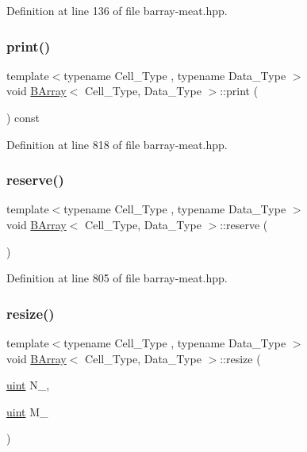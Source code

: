 Definition at line 136 of file barray-\/meat.\+hpp.

\mbox{\label{class_b_array_a9d150c44b23cf1e4af45f540508db1de}} 
\subsubsection{\texorpdfstring{print()}{print()}}
{\footnotesize\ttfamily template$<$typename Cell\+\_\+\+Type , typename Data\+\_\+\+Type $>$ \\
void \hyperlink{class_b_array}{B\+Array}$<$ Cell\+\_\+\+Type, Data\+\_\+\+Type $>$\+::print (\begin{DoxyParamCaption}{ }\end{DoxyParamCaption}) const\hspace{0.3cm}{\ttfamily [inline]}}



Definition at line 818 of file barray-\/meat.\+hpp.

\mbox{\label{class_b_array_a5eacd388e3d0f638f2c35b6e0f0c490c}} 
\subsubsection{\texorpdfstring{reserve()}{reserve()}}
{\footnotesize\ttfamily template$<$typename Cell\+\_\+\+Type , typename Data\+\_\+\+Type $>$ \\
void \hyperlink{class_b_array}{B\+Array}$<$ Cell\+\_\+\+Type, Data\+\_\+\+Type $>$\+::reserve (\begin{DoxyParamCaption}{ }\end{DoxyParamCaption})\hspace{0.3cm}{\ttfamily [inline]}}



Definition at line 805 of file barray-\/meat.\+hpp.

\mbox{\label{class_b_array_aefe411fe1890273518bfbc3f8ca616ce}} 
\subsubsection{\texorpdfstring{resize()}{resize()}}
{\footnotesize\ttfamily template$<$typename Cell\+\_\+\+Type , typename Data\+\_\+\+Type $>$ \\
void \hyperlink{class_b_array}{B\+Array}$<$ Cell\+\_\+\+Type, Data\+\_\+\+Type $>$\+::resize (\begin{DoxyParamCaption}\item[{\hyperlink{typedefs_8hpp_a91ad9478d81a7aaf2593e8d9c3d06a14}{uint}}]{N\+\_\+,  }\item[{\hyperlink{typedefs_8hpp_a91ad9478d81a7aaf2593e8d9c3d06a14}{uint}}]{M\+\_\+ }\end{DoxyParamCaption})\hspace{0.3cm}{\ttfamily [inline]}}



